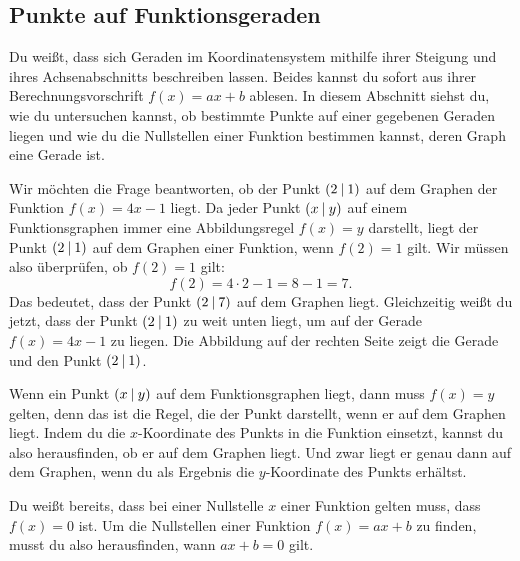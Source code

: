 \documentclass[../../main.tex]{subfiles}
\begin{document}
\subsection{Punkte auf Funktionsgeraden}

Du weißt, dass sich Geraden im Koordinatensystem mithilfe ihrer Steigung und ihres Achsenabschnitts beschreiben lassen. Beides kannst du sofort aus ihrer Berechnungsvorschrift $f(x)=ax+b$ ablesen. In diesem Abschnitt siehst du, wie du untersuchen kannst, ob bestimmte Punkte auf einer gegebenen Geraden liegen und wie du die Nullstellen einer Funktion bestimmen kannst, deren Graph eine Gerade ist.

\begin{example}{}
    Wir möchten die Frage beantworten, ob der Punkt $\left(2 \:\middle|\: 1\right)$ auf dem Graphen der Funktion $f(x)=4x-1$ liegt. Da jeder Punkt $\left(x \:\middle|\: y\right)$ auf einem Funktionsgraphen immer eine Abbildungsregel $f(x)=y$ darstellt, liegt der Punkt $\left(2 \:\middle|\: 1\right)$ auf dem Graphen einer Funktion, wenn $f(2)=1$ gilt. Wir müssen also überprüfen, ob $f(2)=1$ gilt:
    \[f(2)=4\cdot 2-1=8-1=7.\]
    Das bedeutet, dass der Punkt $\left(2 \:\middle|\: 7\right)$ auf dem Graphen liegt. Gleichzeitig weißt du jetzt, dass der Punkt $\left(2 \:\middle|\: 1\right)$ zu weit unten liegt, um auf der Gerade $f(x)=4x-1$ zu liegen. Die Abbildung auf der rechten Seite zeigt die Gerade und den Punkt $\left(2 \:\middle|\: 1\right)$.
\end{example}

Wenn ein Punkt $\left(x \:\middle|\: y\right)$ auf dem Funktionsgraphen liegt, dann muss $f(x)=y$ gelten, denn das ist die Regel, die der Punkt darstellt, wenn er auf dem Graphen liegt. Indem du die $x$-Koordinate des Punkts in die Funktion einsetzt, kannst du also herausfinden, ob er auf dem Graphen liegt. Und zwar liegt er genau dann auf dem Graphen, wenn du als Ergebnis die $y$-Koordinate des Punkts erhältst.

Du weißt bereits, dass bei einer Nullstelle $x$ einer Funktion gelten muss, dass $f(x)=0$ ist. Um die Nullstellen einer Funktion $f(x)=ax+b$ zu finden, musst du also herausfinden, wann $ax+b=0$ gilt.
\end{document}
